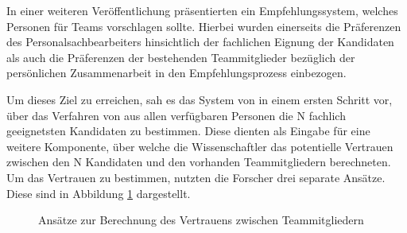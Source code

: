 In einer weiteren Veröffentlichung präsentierten \textcite[S. 1]{malinowski:2005} ein Empfehlungssystem, welches Personen für Teams vorschlagen sollte. Hierbei wurden einerseits die Präferenzen des Personalsachbearbeiters hinsichtlich der fachlichen Eignung der Kandidaten als auch die Präferenzen der bestehenden Teammitglieder bezüglich der persönlichen Zusammenarbeit in den Empfehlungsprozess einbezogen.

Um dieses Ziel zu erreichen, sah es das System von \textcite[S. 4ff.]{malinowski:2005} in einem ersten Schritt vor, über das Verfahren von \textcite[S. 8ff.]{faerber:2003} aus allen verfügbaren Personen die N fachlich geeignetsten Kandidaten zu bestimmen. Diese dienten als Eingabe für eine weitere Komponente, über welche die Wissenschaftler das potentielle Vertrauen zwischen den N Kandidaten und den vorhanden Teammitgliedern berechneten. Um das Vertrauen zu bestimmen, nutzten die Forscher drei separate Ansätze. Diese sind in Abbildung \ref{fig:verwandteArbeiten:abb2} dargestellt.

\begin{figure}[h]
	\centering
	
	
	\caption{Ansätze zur Berechnung des Vertrauens zwischen Teammitgliedern \cite[S. 5]{malinowski:2005}}
	\label{fig:verwandteArbeiten:abb2}
\end{figure}

